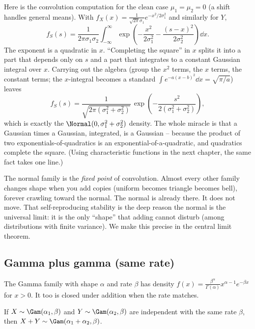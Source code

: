 \begin{whybox}
Here is the convolution computation for the clean case
$\mu_1=\mu_2=0$ (a shift handles general means). With
$f_X(x)=\frac{1}{\sqrt{2\pi}\sigma_1}e^{-x^2/2\sigma_1^2}$ and similarly
for $Y$,
\[
f_S(s) = \frac{1}{2\pi\sigma_1\sigma_2}\int_{-\infty}^{\infty}
   \exp\!\left(-\frac{x^2}{2\sigma_1^2}-\frac{(s-x)^2}{2\sigma_2^2}\right)\dd x.
\]
The exponent is a quadratic in $x$. ``Completing the square'' in $x$
splits it into a part that depends only on $s$ and a part that integrates
to a constant Gaussian integral over $x$. Carrying out the algebra (group
the $x^2$ terms, the $x$ terms, the constant terms; the $x$-integral
becomes a standard $\int e^{-a(x-b)^2}\dd x=\sqrt{\pi/a}$) leaves
\[
f_S(s) = \frac{1}{\sqrt{2\pi(\sigma_1^2+\sigma_2^2)}}\,
         \exp\!\left(-\frac{s^2}{2(\sigma_1^2+\sigma_2^2)}\right),
\]
which is exactly the $\Normal(0,\sigma_1^2+\sigma_2^2)$ density. The whole
miracle is that a Gaussian times a Gaussian, integrated, is a Gaussian --
because the product of two exponentials-of-quadratics is an
exponential-of-a-quadratic, and quadratics complete the square. (Using
characteristic functions in the next chapter, the same fact takes one
line.)
\end{whybox}

\begin{aestheticbox}
The normal family is the \emph{fixed point} of convolution. Almost every
other family changes shape when you add copies (uniform becomes triangle
becomes bell), forever crawling toward the normal. The normal is already
there. It does not move. That self-reproducing stability is the deep
reason the normal is the universal limit: it is the only ``shape'' that
adding cannot disturb (among distributions with finite variance). We make
this precise in the central limit theorem.
\end{aestheticbox}

\subsection{Gamma plus gamma (same rate)}

The Gamma family with shape $\alpha$ and rate $\beta$ has density
$f(x)=\frac{\beta^\alpha}{\Gamma(\alpha)}x^{\alpha-1}e^{-\beta x}$ for
$x>0$. It too is closed under addition when the rate matches.

\begin{theorem}
\label{ch17:thm-gamma-add}
If $X\sim\Gam(\alpha_1,\beta)$ and $Y\sim\Gam(\alpha_2,\beta)$ are
independent with the same rate $\beta$, then
$X+Y\sim\Gam(\alpha_1+\alpha_2,\beta)$.
\end{theorem}

